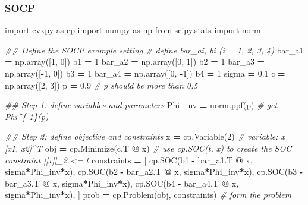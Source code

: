 \documentclass[
]{book}
\newenvironment{Shaded}{\begin{snugshade}}{\end{snugshade}}
\newcommand{\CommentTok}[1]{\textcolor[rgb]{0.56,0.35,0.01}{\textit{#1}}}
\newcommand{\DecValTok}[1]{\textcolor[rgb]{0.00,0.00,0.81}{#1}}
\newcommand{\FloatTok}[1]{\textcolor[rgb]{0.00,0.00,0.81}{#1}}
\newcommand{\ImportTok}[1]{#1}
\newcommand{\NormalTok}[1]{#1}
\newcommand{\OperatorTok}[1]{\textcolor[rgb]{0.81,0.36,0.00}{\textbf{#1}}}
\theoremstyle{definition}
\theoremstyle{definition}
\theoremstyle{definition}
\theoremstyle{definition}
\theoremstyle{remark}
\begin{document}
\hypertarget{socp}{%
\subsubsection{SOCP}\label{socp}}

\begin{Shaded}
\begin{Highlighting}[]
\ImportTok{import}\NormalTok{ cvxpy }\ImportTok{as}\NormalTok{ cp}
\ImportTok{import}\NormalTok{ numpy }\ImportTok{as}\NormalTok{ np}
\ImportTok{from}\NormalTok{ scipy.stats }\ImportTok{import}\NormalTok{ norm}

\CommentTok{\#\# Define the SOCP example setting}
\CommentTok{\# define bar\_ai, bi (i = 1, 2, 3, 4)}
\NormalTok{bar\_a1 }\OperatorTok{=}\NormalTok{ np.array([}\DecValTok{1}\NormalTok{, }\DecValTok{0}\NormalTok{])}
\NormalTok{b1 }\OperatorTok{=} \DecValTok{1}
\NormalTok{bar\_a2 }\OperatorTok{=}\NormalTok{ np.array([}\DecValTok{0}\NormalTok{, }\DecValTok{1}\NormalTok{])}
\NormalTok{b2 }\OperatorTok{=} \DecValTok{1}
\NormalTok{bar\_a3 }\OperatorTok{=}\NormalTok{ np.array([}\OperatorTok{{-}}\DecValTok{1}\NormalTok{, }\DecValTok{0}\NormalTok{])}
\NormalTok{b3 }\OperatorTok{=} \DecValTok{1}
\NormalTok{bar\_a4 }\OperatorTok{=}\NormalTok{ np.array([}\DecValTok{0}\NormalTok{, }\OperatorTok{{-}}\DecValTok{1}\NormalTok{])}
\NormalTok{b4 }\OperatorTok{=} \DecValTok{1}
\NormalTok{sigma }\OperatorTok{=} \FloatTok{0.1} 
\NormalTok{c }\OperatorTok{=}\NormalTok{ np.array([}\DecValTok{2}\NormalTok{, }\DecValTok{3}\NormalTok{])}
\NormalTok{p }\OperatorTok{=} \FloatTok{0.9} \CommentTok{\# p should be more than 0.5}

\CommentTok{\#\# Step 1: define variables and parameters}
\NormalTok{Phi\_inv }\OperatorTok{=}\NormalTok{ norm.ppf(p) }\CommentTok{\# get Phi\^{}\{{-}1\}(p)}

\CommentTok{\#\# Step 2: define objective and constraints}
\NormalTok{x }\OperatorTok{=}\NormalTok{ cp.Variable(}\DecValTok{2}\NormalTok{) }\CommentTok{\# variable: x = [x1, x2]\^{}T}
\NormalTok{obj }\OperatorTok{=}\NormalTok{ cp.Minimize(c.T }\OperatorTok{@}\NormalTok{ x)}
\CommentTok{\# use cp.SOC(t, x) to create the SOC constraint ||x||\_2 \textless{}= t}
\NormalTok{constraints }\OperatorTok{=}\NormalTok{ [}
\NormalTok{    cp.SOC(b1 }\OperatorTok{{-}}\NormalTok{ bar\_a1.T }\OperatorTok{@}\NormalTok{ x, sigma}\OperatorTok{*}\NormalTok{Phi\_inv}\OperatorTok{*}\NormalTok{x),}
\NormalTok{    cp.SOC(b2 }\OperatorTok{{-}}\NormalTok{ bar\_a2.T }\OperatorTok{@}\NormalTok{ x, sigma}\OperatorTok{*}\NormalTok{Phi\_inv}\OperatorTok{*}\NormalTok{x),}
\NormalTok{    cp.SOC(b3 }\OperatorTok{{-}}\NormalTok{ bar\_a3.T }\OperatorTok{@}\NormalTok{ x, sigma}\OperatorTok{*}\NormalTok{Phi\_inv}\OperatorTok{*}\NormalTok{x),}
\NormalTok{    cp.SOC(b4 }\OperatorTok{{-}}\NormalTok{ bar\_a4.T }\OperatorTok{@}\NormalTok{ x, sigma}\OperatorTok{*}\NormalTok{Phi\_inv}\OperatorTok{*}\NormalTok{x),}
\NormalTok{]}
\NormalTok{prob }\OperatorTok{=}\NormalTok{ cp.Problem(obj, constraints) }\CommentTok{\# form the problem}


\end{Highlighting}
\end{Shaded}
\end{document}
